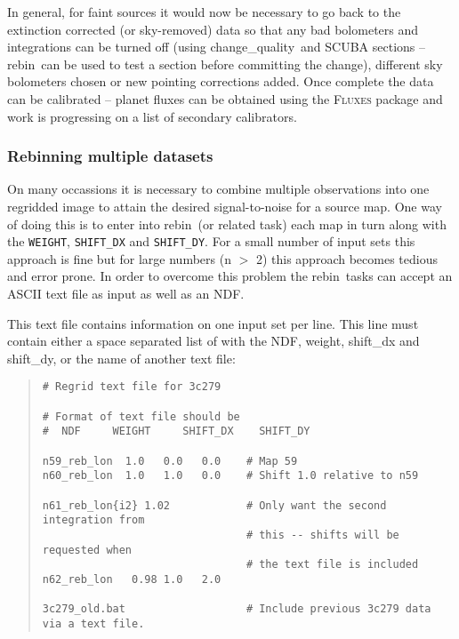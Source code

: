 \documentclass[twoside,11pt]{article}
\newcommand{\task}[1]{{\sf #1}}
\newcommand{\param}[1]{{\tt #1}}
\newcommand{\rebin}{\htmlref{\task{rebin}}{REBIN}}
\newcommand{\chgqual}{\htmlref{\task{change\_quality}}{CHANGE_QUALITY}}
\newenvironment{myquote}{\begin{quote}\begin{small}}{\end{small}\end{quote}}
\newcommand{\htmlref}[2]{#1}
\begin{document}
In general, for faint sources it would now be necessary to go back to the
extinction corrected (or sky-removed) data so that any bad bolometers and
integrations can be turned off (using \chgqual\ and SCUBA sections -- \rebin\
can be used to test a section before committing the change), different sky
bolometers chosen or new pointing corrections added. Once complete the data
can be calibrated -- planet fluxes can be obtained using the \textsc{Fluxes}
package and work is progressing on a list of secondary calibrators.


\subsubsection{Rebinning multiple datasets}
\label{batch}

On many occassions it is necessary to combine multiple observations into one
regridded image to attain the desired signal-to-noise for a source map. One
way of doing this is to enter into \rebin\ (or related task) each map in turn
along with the \param{WEIGHT}, \param{SHIFT\_DX} and \param{SHIFT\_DY}. For a
small number of input sets this approach is fine but for large numbers (n $>$
2) this approach becomes tedious and error prone.  In order to overcome this
problem the \rebin\ tasks can accept an ASCII text file as input as well as an
NDF.

This text file contains information on one input set per line. This line
must contain either a space separated list of with the NDF, weight, shift\_dx
and shift\_dy, or the name of another text file:

\begin{myquote}
\begin{verbatim}
# Regrid text file for 3c279

# Format of text file should be
#  NDF     WEIGHT     SHIFT_DX    SHIFT_DY

n59_reb_lon  1.0   0.0   0.0    # Map 59
n60_reb_lon  1.0   1.0   0.0    # Shift 1.0 relative to n59

n61_reb_lon{i2} 1.02            # Only want the second integration from
                                # this -- shifts will be requested when
                                # the text file is included
n62_reb_lon   0.98 1.0   2.0    

3c279_old.bat                   # Include previous 3c279 data via a text file.
\end{verbatim}
\end{myquote}
\end{document}
